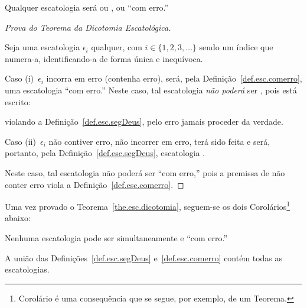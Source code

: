     \begin{THE}
        \label{the.esc.dicotomia}
        Qualquer escatologia será ou , ou ``com erro.''
    \end{THE}

    \begin{proof}[Prova do Teorema da Dicotomia Escatológica]
        \label{pro.the.dicotomia}

        Seja uma escatologia $\epsilon_i$ qualquer, com $i \in \{1, 2, 3, \ldots\}$ sendo um  índice  que  numera-a,
        i\-den\-ti\-fi\-can\-do-a de forma única e inequívoca.

        Caso (i)~$\epsilon_i$ incorra em erro  (contenha  erro),  será,  pela  Definição~\ref{def.esc.comerro},  uma
        escatologia ``com erro.'' Neste caso, tal escatologia \emph{não poderá} ser , pois está
        escrito:


        \noindent violando a Definição~\ref{def.esc.segDeus}, pelo erro jamais proceder da verdade.

        Caso (ii)~$\epsilon_i$ não contiver erro, não incorrer em erro, terá sido feita     e     será,     portanto,     pela
        Definição~\ref{def.esc.segDeus}, escatologia .

        Neste caso, tal escatologia não poderá ser ``com erro,'' pois a premissa de não conter erro viola a
        Definição~\ref{def.esc.comerro}.

    \end{proof}

    Uma vez provado o Teorema~\ref{the.esc.dicotomia}, seguem-se os dois Corolários\footnote{Corolário é uma consequência que se
    segue, por exemplo, de um Teorema.} abaixo:

    \begin{COR}
        \label{cor.dicotomia.1}
        Nenhuma escatologia pode ser simultaneamente  e ``com erro.''
    \end{COR}

    \begin{COR}
        \label{cor.dicotomia.2}
        A união das Definições~\ref{def.esc.segDeus} e~\ref{def.esc.comerro} contém todas as escatologias.
    \end{COR}

